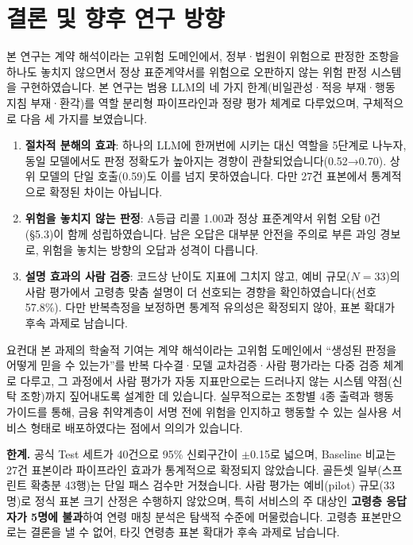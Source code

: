 \documentclass[10pt,a4paper]{article}
\begin{document}
\section{결론 및 향후 연구 방향}
본 연구는 계약 해석이라는 고위험 도메인에서, 정부·법원이 위험으로 판정한 조항을 하나도 놓치지 않으면서 정상 표준계약서를 위험으로 오판하지 않는 위험 판정 시스템을 구현하였습니다. 본 연구는 범용 LLM의 네 가지 한계(비일관성·적응 부재·행동 지침 부재·환각)를 역할 분리형 파이프라인과 정량 평가 체계로 다루었으며, 구체적으로 다음 세 가지를 보였습니다.
\begin{enumerate}
\item \textbf{절차적 분해의 효과}: 하나의 LLM에 한꺼번에 시키는 대신 역할을 5단계로 나누자, 동일 모델에서도 판정 정확도가 높아지는 경향이 관찰되었습니다(0.52→0.70). 상위 모델의 단일 호출(0.59)도 이를 넘지 못하였습니다. 다만 27건 표본에서 통계적으로 확정된 차이는 아닙니다.
\item \textbf{위험을 놓치지 않는 판정}: A등급 리콜 1.00과 정상 표준계약서 위험 오탐 0건(\S5.3)이 함께 성립하였습니다. 남은 오답은 대부분 안전을 주의로 부른 과잉 경보로, 위험을 놓치는 방향의 오답과 성격이 다릅니다.
\item \textbf{설명 효과의 사람 검증}: 코드상 난이도 지표에 그치지 않고, 예비 규모($N=33$)의 사람 평가에서 고령층 맞춤 설명이 더 선호되는 경향을 확인하였습니다(선호 57.8\%). 다만 반복측정을 보정하면 통계적 유의성은 확정되지 않아, 표본 확대가 후속 과제로 남습니다.
\end{enumerate}
요컨대 본 과제의 학술적 기여는 계약 해석이라는 고위험 도메인에서 ``생성된 판정을 어떻게 믿을 수 있는가''를 반복 다수결·모델 교차검증·사람 평가라는 다중 검증 체계로 다루고, 그 과정에서 사람 평가가 자동 지표만으로는 드러나지 않는 시스템 약점(신탁 조항)까지 짚어내도록 설계한 데 있습니다. 실무적으로는 조항별 4종 출력과 행동 가이드를 통해, 금융 취약계층이 서명 전에 위험을 인지하고 행동할 수 있는 실사용 서비스 형태로 배포하였다는 점에서 의의가 있습니다.

\textbf{한계.} 공식 Test 세트가 40건으로 95\% 신뢰구간이 $\pm$0.15로 넓으며, Baseline 비교는 27건 표본이라 파이프라인 효과가 통계적으로 확정되지 않았습니다. 골든셋 일부(스프린트 확충분 43행)는 단일 패스 검수만 거쳤습니다. 사람 평가는 예비(pilot) 규모(33명)로 정식 표본 크기 산정은 수행하지 않았으며, 특히 서비스의 주 대상인 \textbf{고령층 응답자가 5명에 불과}하여 연령 매칭 분석은 탐색적 수준에 머물렀습니다. 고령층 표본만으로는 결론을 낼 수 없어, 타깃 연령층 표본 확대가 후속 과제로 남습니다.
\end{document}

